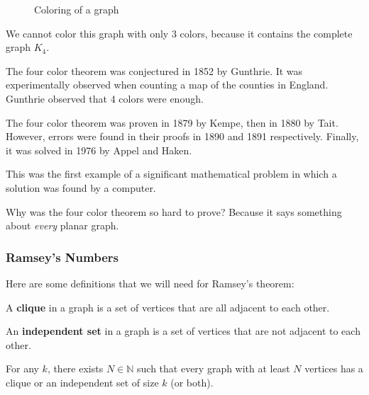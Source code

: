 \documentclass[a4paper]{article}
\begin{document}
\begin{figure}[ht]
    \centering
    \caption{Coloring of a graph}
    \label{fig:coloring-of-a-graph}
\end{figure}

\begin{note}
	We cannot color this graph with only 3 colors, because it contains the complete graph \( K_4 \).
\end{note}

The four color theorem was conjectured in 1852 by Gunthrie. It was experimentally observed when counting a map of the counties in England. Gunthrie observed that 4 colors were enough. \par

The four color theorem was proven in 1879 by Kempe, then in 1880 by Tait. However, errors were found in their proofs in 1890 and 1891 respectively. Finally, it was solved in 1976 by Appel and Haken.

\begin{note}
	This was the first example of a significant mathematical problem in which a solution was found by a computer.
\end{note}

Why was the four color theorem so hard to prove? Because it says something about \textit{every} planar graph.

\subsubsection{Ramsey's Numbers}

Here are some definitions that we will need for Ramsey's theorem:

\begin{definition}
	A \textbf{clique} in a graph is a set of vertices that are all adjacent to each other.
\end{definition}

\begin{definition}
	An \textbf{independent set} in a graph is a set of vertices that are not adjacent to each other.
\end{definition}

\begin{theorem}
	For any \( k \), there exists \( N \in  \mathbb{N} \) such that every graph with at least \( N \) vertices has a clique or an independent set of size \( k \) (or both).
\end{theorem}
\end{document}
